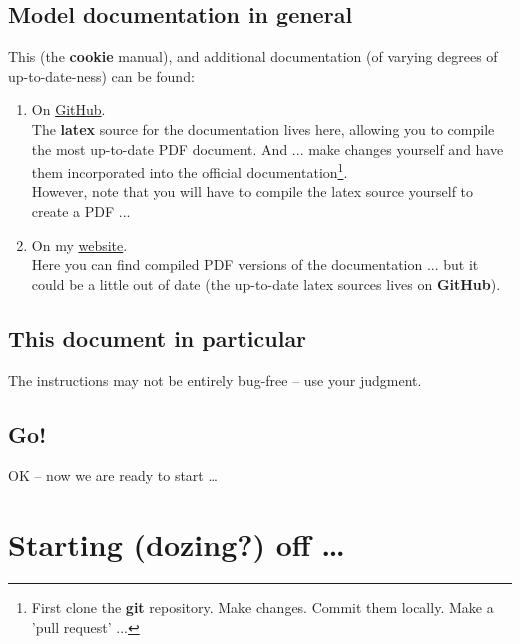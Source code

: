 \subsection*{Model documentation in general}

This (the \textbf{cookie} manual), and additional documentation (of varying degrees of up-to-date-ness) can be found:

\vspace{1mm}
\begin{enumerate}[noitemsep]
\setlength{\itemindent}{.2in}
\item On \href{https://github.com/genie-model/cookiedoc}{GitHub}.
\\The \textbf{latex} source for the documentation lives here, allowing you to compile the most up-to-date PDF document. And ... make changes yourself and have them incorporated into the official documentation\footnote{First clone the \textbf{git} repository. Make changes. Commit them locally. Make a 'pull request' ...}.
\\However, note that you will have to compile the latex source yourself to create a PDF ...
\item On my \href{http://www.seao2.info/mymuffin.html}{website}.
\\Here you can find compiled PDF versions of the documentation ... but it could be a little out of date (the up-to-date latex sources lives on \textbf{GitHub}).
\end{enumerate}


\subsection*{This document in particular}

The instructions  may not be entirely bug-free – use your judgment.


\subsection*{Go!}

OK – now we are ready to start …

\newpage

\section{Starting (dozing?) off …}

